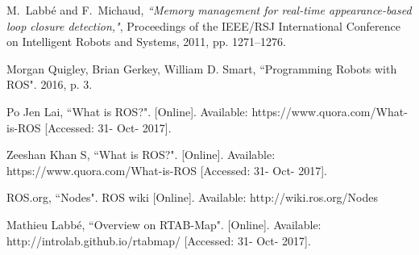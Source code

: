 \documentclass[journal]{IEEEtran}
\begin{document}
\ifCLASSOPTIONcaptionsoff
  \newpage
\fi





%
%
%
\begin{thebibliography}{1}

M.~Labbé and F.~Michaud, \emph{``Memory management for real-time appearance-based loop closure detection,"},
Proceedings of the IEEE/RSJ International Conference on Intelligent Robots and Systems, 2011, pp. 1271–1276.

Morgan Quigley, Brian Gerkey, William D. Smart, ``Programming Robots with ROS". 2016, p. 3.

Po Jen Lai, ``What is ROS?". [Online]. Available: 
https://www.quora.com/What-is-ROS
[Accessed: 31- Oct- 2017].

Zeeshan Khan S, ``What is ROS?". [Online]. Available: 
https://www.quora.com/What-is-ROS
[Accessed: 31- Oct- 2017].

ROS.org, ``Nodes". ROS wiki [Online]. Available: http://wiki.ros.org/Nodes

Mathieu Labbé, ``Overview on RTAB-Map". [Online]. Available: 
http://introlab.github.io/rtabmap/
[Accessed: 31- Oct- 2017].

\end{thebibliography}
\end{document}
